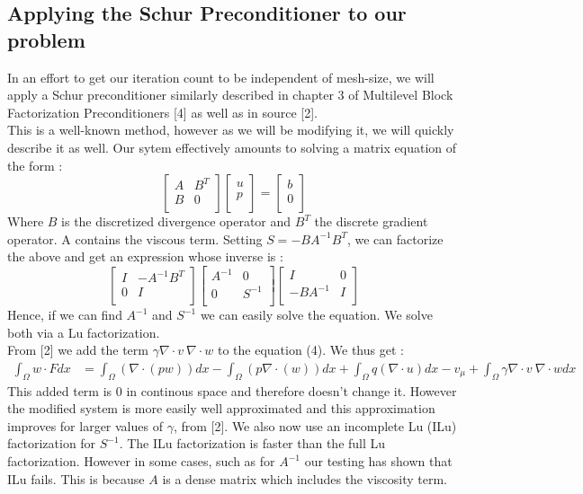 \documentclass[11pt,twoside,a4paper]{article}
\begin{document}
\subsection{Applying the Schur Preconditioner to our problem}
In an effort to get our iteration count to be independent of mesh-size, we will apply a Schur preconditioner similarly described in chapter 3 of Multilevel Block Factorization Preconditioners [4] as well as in source [2].\\
This is a well-known method, however as we will be modifying it, we will quickly describe it as well.
Our sytem effectively amounts to solving a matrix equation of the form :
$$ 
\begin{bmatrix} 
A         & B^{T}\\
B         & 0 \\
\end{bmatrix}
\begin{bmatrix} 
u    \\
p     \\  
\end{bmatrix}
=
\begin{bmatrix} 
b    \\
0     \\  
\end{bmatrix}
$$
Where $B$ is the discretized divergence operator and $B^T$ the discrete gradient operator. A contains the viscous term.
Setting $S = - B A^{-1} B^{T}$, we can factorize the above and get an expression whose inverse is : 
$$
\begin{bmatrix} 
I         & - A^{-1} B^{T}\\
0         & I \\
\end{bmatrix}
\begin{bmatrix} 
A^{-1}   & 0\\
0       & S^{-1} \\
\end{bmatrix}
\begin{bmatrix} 
I & 0\\
 - B A^{-1}       & I \\
\end{bmatrix}
$$
Hence, if we can find $A^{-1}$ and $S^{-1}$ we can easily solve the equation. We solve both via a Lu factorization.\\
From [2] we add the term $\gamma \nabla \cdot v \: \nabla \cdot w$ to the equation (4). We thus get : 
\begin{align}
\int_\Omega w \cdot F dx &= \int_\Omega (\nabla \cdot (p w)) dx - \int_\Omega ( p \nabla \cdot (w)) dx + \int_\Omega q (\nabla \cdot u) dx  - v_\mu + \int_\Omega \gamma \nabla \cdot v \: \nabla \cdot w dx
\end{align}
This added term is $0$ in continous space and therefore doesn't change it. However the modified system is more easily well approximated and this approximation improves for larger values of $\gamma$, from [2]. We also now use an incomplete Lu (ILu) factorization for $S^{-1}$. The ILu factorization is faster than the full Lu factorization. However in some cases, such as for $A^{-1}$ our testing has shown that ILu fails. This is because $A$ is a dense matrix which includes the viscosity term.
\end{document}
